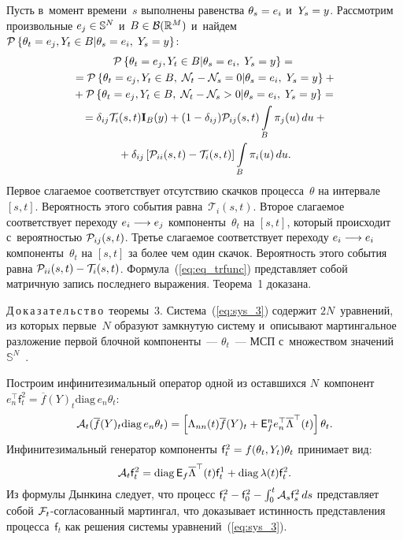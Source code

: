 \begin{multicols}{2}
{Пусть в~момент времени~$s$ выполнены равенства $\theta_s \hm= e_i$ и~$Y_s\hm=y$. 
Рассмотрим произвольные $e_j \hm\in \mathbb{S}^N$ и~$B \hm\in 
\mathcal{B}(\mathbb{R}^M)$ и~найдем $\pp{\theta_t \hm= e_j, Y_t \hm\in B | \theta_s \hm= 
e_i,\;Y_s=y}$:
\begin{multline*}
\mathcal{P}\left\{ \theta_t = e_j, Y_t \in B | \theta_s = e_i,\;Y_s=y \right\}
={}\\
{}=\mathcal{P}\left\{ \theta_t = e_j, Y_t \in B, \; {\mathcal N}_t-{\mathcal N}_s=0 | \theta_s = e_i,\;Y_s=y \right\} + {}\\
{} +
\mathcal{P}\left\{ \theta_t = e_j, Y_t \in B, \; {\mathcal N}_t-{\mathcal N}_s>0 | \theta_s = e_i,\;Y_s=y \right\}={} \\ 
{}=
\delta_{ij} \mathcal{T}_i(s, t)\mathbf{I}_B(y) + (1-\delta_{ij}) 
{\mathcal P}_{ij}(s,t)\int\limits_B \pi_j(u)\,du +{}\\
{}+
\delta_{ij}\left[ {\mathcal P}_{ii}(s,t) -  \mathcal{T}_i(s, t)\right] \int\limits_B 
\pi_i(u)\,du.
\end{multline*}
Первое слагаемое
соответствует отсутствию скачков процесса~$\theta$ на интервале $[s,t]$. 
Вероятность этого события равна~$\mathcal{T}_i(s, t)$. Второе слагаемое 
соответствует переходу $e_i \hm\longrightarrow e_j $ компоненты~$\theta_t$ на 
$[s,t]$, который происходит с~вероятностью ${\mathcal P}_{ij}(s,t)$. Третье слагаемое 
соответствует переходу $e_i \hm\longrightarrow e_i $ компоненты~$\theta_t$ на 
$[s,t]$ за более чем один скачок. Вероятность этого события равна 
$\ppp_{ii}(s,t) \hm-  \mathcal{T}_i(s, t)$. Формула~(\ref{eq:eq_trfunc}) 
представляет собой матричную запись последнего выражения.
Теорема~1 доказана.


\smallskip

\noindent
Д\,о\,к\,а\,з\,а\,т\,е\,л\,ь\,с\,т\,в\,о\ теоремы~3.
Система~(\ref{eq:sys_3}) содержит $2N$~уравнений, из которых первые~$N$ образуют 
замкнутую систему и~описывают мартингальное разложение первой блочной компоненты~--- $\theta_t$~--- МСП с~множеством значений~$\mathbb{S}^N$~\cite{EAM_10}.

 Построим инфинитезимальный оператор одной из оставшихся $N$~компонент
   $e_n^{\top} \mathsf{f}^2_t= \overline{f}(Y)_t \mathrm{diag}\,e_n \theta_t
   $:
   $$
   \mathcal{A}_t(\overline{f}(Y)_t \mathrm{diag}\,e_n \theta_t)\hm =
  \left[
  \Lambda_{nn}(t)\overline{f}(Y)_t\hm + {\mathsf E}_f^n e_n^{\top} 
\overline{\Lambda}^{\top}(t)
  \right] \theta_t.
  $$
   Инфинитезимальный генератор компоненты $\mathsf{f}^2_t \hm= 
f(\theta_t,Y_t)\theta_t$ принимает вид:
$$  
 \mathcal{A}_t\mathsf{f}^2_t \hm= \mathrm{diag}\,{\mathsf E}_f \overline{\Lambda}^{\top}(t) 
\mathsf{f}^1_t \hm+ \mathrm{diag}\,\lambda(t) \mathsf{f}^2_t.
$$
   Из формулы Дынкина следует, что процесс
   $   \mathsf{f}^2_t \hm- \mathsf{f}^2_0\hm - \int\nolimits_0^t \mathcal{A}_s\mathsf{f}^2_s \,ds$
   представляет собой ${\mathcal F}_t$-со\-гла\-со\-ван\-ный мартингал, что доказывает истинность 
представления процесса~$\mathsf{f}_t$ как решения системы уравнений~(\ref{eq:sys_3}).

}
\end{multicols}
